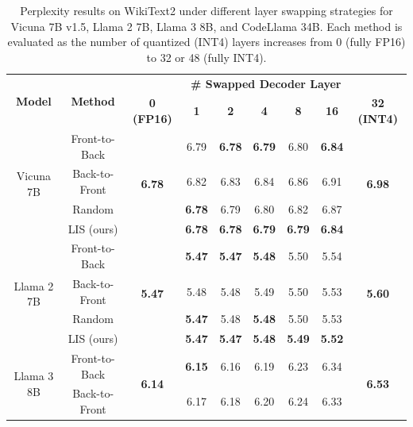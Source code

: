 \begin{table}[ht]
\centering
\small
\caption{Perplexity results on WikiText2 under different layer swapping strategies for Vicuna 7B v1.5, Llama 2 7B, Llama 3 8B, and CodeLlama 34B. Each method is evaluated as the number of quantized (INT4) layers increases from 0 (fully FP16) to 32 or 48 (fully INT4).} \label{tab:perp_results_on_wikitext2}
\label{table:ppl}
\begin{tabular}{cc|ccccccc}
\toprule
\multirow{2}{*}{\textbf{Model}} & \multirow{2}{*}{\textbf{Method}} & \multicolumn{7}{|c}{\textbf{\# Swapped Decoder Layer}} \\
 & & \multicolumn{1}{|c}{\textbf{0 (FP16)}} & \multicolumn{1}{c}{\textbf{1}} & \multicolumn{1}{c}{\textbf{2}} & \multicolumn{1}{c}{\textbf{4}} & \multicolumn{1}{c}{\textbf{8}} & \multicolumn{1}{c}{\textbf{16}} & \multicolumn{1}{c}{\textbf{32 (INT4)}} \\
\midrule
\multirow{4}{*}{Vicuna 7B} 
& Front-to-Back & \multirow{4}{*}{\textbf{6.78}} & 6.79 & \textbf{6.78} & \textbf{6.79} & 6.80 & \textbf{6.84} & \multirow{4}{*}{\textbf{6.98}} \\
& Back-to-Front &                       & 6.82 & 6.83 & 6.84 & 6.86 & 6.91 &            \\
& Random        &                       & \textbf{6.78} & 6.79 & 6.80 & 6.82 & 6.87 &            \\
& LIS (ours)           &                       & \textbf{6.78} & \textbf{6.78} & \textbf{6.79} & \textbf{6.79} & \textbf{6.84} &            \\
\midrule
\multirow{4}{*}{Llama 2 7B} 
& Front-to-Back & \multirow{4}{*}{\textbf{5.47}} & \textbf{5.47} & \textbf{5.47} & \textbf{5.48} & 5.50 & 5.54 & \multirow{4}{*}{\textbf{5.60}} \\
& Back-to-Front &                       & 5.48 & 5.48 & 5.49 & 5.50 & 5.53 &            \\
& Random        &                       & \textbf{5.47} & 5.48 & \textbf{5.48} & 5.50 & 5.53 &            \\
& LIS (ours)           &                       & \textbf{5.47} & \textbf{5.47} & \textbf{5.48} & \textbf{5.49} & \textbf{5.52} &            \\
\midrule
\multirow{4}{*}{Llama 3 8B} 
& Front-to-Back & \multirow{4}{*}{\textbf{6.14}} & \textbf{6.15} & 6.16 & 6.19 & 6.23 & 6.34 & \multirow{4}{*}{\textbf{6.53}} \\
& Back-to-Front &                       & 6.17 & 6.18 & 6.20 & 6.24 & 6.33 &            \\

\end{tabular}
\end{table}
